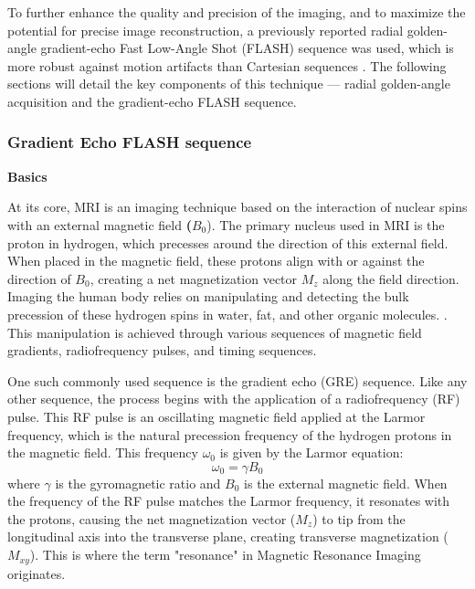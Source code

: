 \documentclass{micro-econ-thesis}
\begin{document}
  
To further enhance the quality and precision of the imaging, and to maximize the potential for precise image reconstruction, a previously reported radial golden-angle gradient-echo Fast Low-Angle Shot (FLASH) sequence was used, which is more robust against motion artifacts than Cartesian sequences \parencite{aleksiev_high-resolution_2022}. The following sections will detail the key components of this technique — radial golden-angle acquisition and the gradient-echo FLASH sequence.

\subsubsection{Gradient Echo FLASH sequence}

\textbf{Basics}

At its core, MRI is an imaging technique based on the interaction of nuclear spins with an external magnetic field \textbf{($B_0$}). The primary nucleus used in MRI is the proton in hydrogen, which precesses around the direction of this external field.  When placed in the magnetic field, these protons align with or against the direction of \textbf{$B_0$}, creating a net magnetization vector \textbf{$M_z$} along the field direction. Imaging the human body relies on manipulating and detecting the bulk precession of these hydrogen spins in water, fat, and other organic molecules. \parencite{brown_magnetic_2014}. This manipulation is achieved through various sequences of magnetic field gradients, radiofrequency pulses, and timing sequences. 


One such commonly used sequence is the gradient echo (GRE) sequence. Like any other sequence, the process begins with the application of a radiofrequency (RF) pulse. This RF pulse is an oscillating magnetic field applied at the Larmor frequency, which is the natural precession frequency of the hydrogen protons in the magnetic field. This frequency $\omega_0$ is given by the Larmor equation:
\begin{equation}
	\omega_0 = \gamma B_0
	\label{eq:larmor}
\end{equation}
where $\gamma$ is the gyromagnetic ratio and $B_0$ is the external magnetic field.
When the frequency of the RF pulse matches the Larmor frequency, it resonates with the protons, causing the net magnetization vector (\textbf{$M_z$}) to tip from the longitudinal axis into the transverse plane, creating transverse magnetization (\textbf{$M_{xy}$}). This is where the term "resonance" in Magnetic Resonance Imaging originates. 
\end{document}
